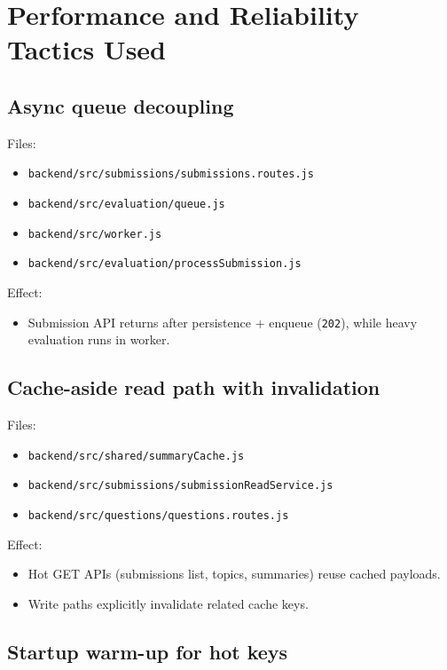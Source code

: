 \documentclass[12pt,journal,onecolumn]{IEEEtran}
\begin{document}
\section{Performance and Reliability Tactics Used}

\subsection{Async queue decoupling}

Files:
\begin{itemize}
    \item \texttt{backend/src/submissions/submissions.routes.js}
    \item \texttt{backend/src/evaluation/queue.js}
    \item \texttt{backend/src/worker.js}
    \item \texttt{backend/src/evaluation/processSubmission.js}
\end{itemize}

Effect:
\begin{itemize}
    \item Submission API returns after persistence + enqueue (\texttt{202}), while heavy evaluation runs in worker.
\end{itemize}

\subsection{Cache-aside read path with invalidation}

Files:
\begin{itemize}
    \item \texttt{backend/src/shared/summaryCache.js}
    \item \texttt{backend/src/submissions/submissionReadService.js}
    \item \texttt{backend/src/questions/questions.routes.js}
\end{itemize}

Effect:
\begin{itemize}
    \item Hot GET APIs (submissions list, topics, summaries) reuse cached payloads.
    \item Write paths explicitly invalidate related cache keys.
\end{itemize}

\subsection{Startup warm-up for hot keys}
\end{document}
